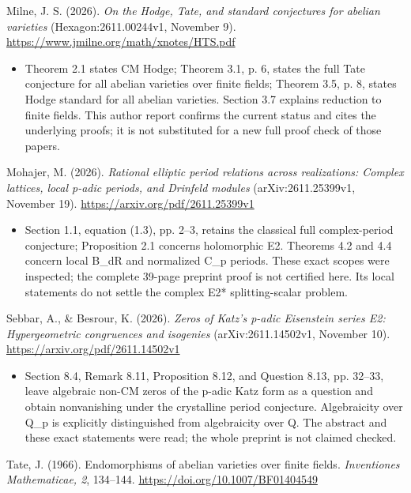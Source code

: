 \documentclass[11pt,a4paper]{article}
\providecommand{\tightlist}{\setlength{\itemsep}{0pt}\setlength{\parskip}{0pt}}
\theoremstyle{definition}\newtheorem{definition}[theorem]{Definition}
\theoremstyle{remark}\newtheorem{remark}[theorem]{Remark}
\begin{document}
Milne, J. S. (2026). \emph{On the Hodge, Tate, and standard conjectures
for abelian varieties} (Hexagon:2611.00244v1, November 9).
\url{https://www.jmilne.org/math/xnotes/HTS.pdf}

\begin{itemize}
\tightlist
\item
  Theorem 2.1 states CM Hodge; Theorem 3.1, p. 6, states the full Tate
  conjecture for all abelian varieties over finite fields; Theorem 3.5,
  p. 8, states Hodge standard for all abelian varieties. Section 3.7
  explains reduction to finite fields. This author report confirms the
  current status and cites the underlying proofs; it is not substituted
  for a new full proof check of those papers.
\end{itemize}

Mohajer, M. (2026). \emph{Rational elliptic period relations across
realizations: Complex lattices, local p-adic periods, and Drinfeld
modules} (arXiv:2611.25399v1, November 19).
\url{https://arxiv.org/pdf/2611.25399v1}

\begin{itemize}
\tightlist
\item
  Section 1.1, equation (1.3), pp. 2--3, retains the classical full
  complex-period conjecture; Proposition 2.1 concerns holomorphic E2.
  Theorems 4.2 and 4.4 concern local B\_dR and normalized C\_p periods.
  These exact scopes were inspected; the complete 39-page preprint proof
  is not certified here. Its local statements do not settle the complex
  E2* splitting-scalar problem.
\end{itemize}

Sebbar, A., \& Besrour, K. (2026). \emph{Zeros of Katz's p-adic
Eisenstein series E2: Hypergeometric congruences and isogenies}
(arXiv:2611.14502v1, November 10).
\url{https://arxiv.org/pdf/2611.14502v1}

\begin{itemize}
\tightlist
\item
  Section 8.4, Remark 8.11, Proposition 8.12, and Question 8.13, pp.
  32--33, leave algebraic non-CM zeros of the p-adic Katz form as a
  question and obtain nonvanishing under the crystalline period
  conjecture. Algebraicity over Q\_p is explicitly distinguished from
  algebraicity over Q. The abstract and these exact statements were
  read; the whole preprint is not claimed checked.
\end{itemize}

Tate, J. (1966). Endomorphisms of abelian varieties over finite fields.
\emph{Inventiones Mathematicae, 2}, 134--144.
\url{https://doi.org/10.1007/BF01404549}
\end{document}
